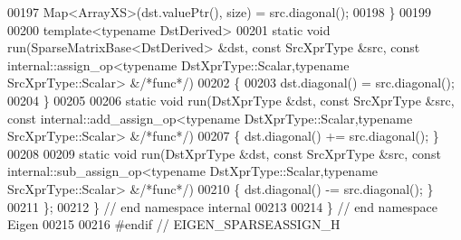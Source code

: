 \begin{DoxyCode}
00197     Map<ArrayXS>(dst.valuePtr(), size) = src.diagonal();
00198   \}
00199   
00200   \textcolor{keyword}{template}<\textcolor{keyword}{typename} DstDerived>
00201   \textcolor{keyword}{static} \textcolor{keywordtype}{void} run(SparseMatrixBase<DstDerived> &dst, \textcolor{keyword}{const} SrcXprType &src, \textcolor{keyword}{const} 
      internal::assign\_op<typename DstXprType::Scalar,typename SrcXprType::Scalar> &\textcolor{comment}{/*func*/})
00202   \{
00203     dst.diagonal() = src.diagonal();
00204   \}
00205   
00206   \textcolor{keyword}{static} \textcolor{keywordtype}{void} run(DstXprType &dst, \textcolor{keyword}{const} SrcXprType &src, \textcolor{keyword}{const} internal::add\_assign\_op<typename
       DstXprType::Scalar,typename SrcXprType::Scalar> &\textcolor{comment}{/*func*/})
00207   \{ dst.diagonal() += src.diagonal(); \}
00208   
00209   \textcolor{keyword}{static} \textcolor{keywordtype}{void} run(DstXprType &dst, \textcolor{keyword}{const} SrcXprType &src, \textcolor{keyword}{const} internal::sub\_assign\_op<typename
       DstXprType::Scalar,typename SrcXprType::Scalar> &\textcolor{comment}{/*func*/})
00210   \{ dst.diagonal() -= src.diagonal(); \}
00211 \};
00212 \} \textcolor{comment}{// end namespace internal}
00213 
00214 \} \textcolor{comment}{// end namespace Eigen}
00215 
00216 \textcolor{preprocessor}{#endif // EIGEN\_SPARSEASSIGN\_H}
\end{DoxyCode}

